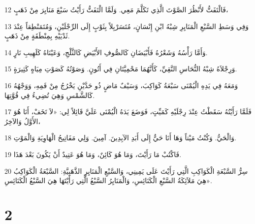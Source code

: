 \par 12 فَالْتَفَتُّ لأَنْظُرَ الصَّوْتَ الَّذِي تَكَلَّمَ مَعِي. وَلَمَّا الْتَفَتُّ رَأَيْتُ سَبْعَ مَنَايِرَ مِنْ ذَهَبٍ،
\par 13 وَفِي وَسَطِ السَّبْعِ الْمَنَايِرِ شِبْهُ ابْنِ إِنْسَانٍ، مُتَسَرْبِلاً بِثَوْبٍ إِلَى الرِّجْلَيْنِ، وَمُتَمَنْطِقاً عِنْدَ ثَدْيَيْهِ بِمِنْطَقَةٍ مِنْ ذَهَبٍ.
\par 14 وَأَمَّا رَأْسُهُ وَشَعْرُهُ فَأَبْيَضَانِ كَالصُّوفِ الأَبْيَضِ كَالثَّلْجِ، وَعَيْنَاهُ كَلَهِيبِ نَارٍ.
\par 15 وَرِجْلاَهُ شِبْهُ النُّحَاسِ النَّقِيِّ، كَأَنَّهُمَا مَحْمِيَّتَانِ فِي أَتُونٍ. وَصَوْتُهُ كَصَوْتِ مِيَاهٍ كَثِيرَةٍ.
\par 16 وَمَعَهُ فِي يَدِهِ الْيُمْنَى سَبْعَةُ كَوَاكِبَ، وَسَيْفٌ مَاضٍ ذُو حَدَّيْنِ يَخْرُجُ مِنْ فَمِهِ، وَوَجْهُهُ كَالشَّمْسِ وَهِيَ تُضِيءُ فِي قُوَّتِهَا.
\par 17 فَلَمَّا رَأَيْتُهُ سَقَطْتُ عِنْدَ رِجْلَيْهِ كَمَيِّتٍ، فَوَضَعَ يَدَهُ الْيُمْنَى عَلَيَّ قَائِلاً لِي: «لاَ تَخَفْ، أَنَا هُوَ الأَوَّلُ وَالآخِرُ،
\par 18 وَالْحَيُّ. وَكُنْتُ مَيْتاً وَهَا أَنَا حَيٌّ إِلَى أَبَدِ الآبِدِينَ. آمِينَ. وَلِي مَفَاتِيحُ الْهَاوِيَةِ وَالْمَوْتِ.
\par 19 فَاكْتُبْ مَا رَأَيْتَ، وَمَا هُوَ كَائِنٌ، وَمَا هُوَ عَتِيدٌ أَنْ يَكُونَ بَعْدَ هَذَا.
\par 20 سِرُّ السَّبْعَةِ الْكَوَاكِبِ الَّتِي رَأَيْتَ عَلَى يَمِينِي، وَالسَّبْعِ الْمَنَايِرِ الذَّهَبِيَّةِ: السَّبْعَةُ الْكَوَاكِبُ هِيَ مَلاَئِكَةُ السَّبْعِ الْكَنَائِسِ، وَالْمَنَايِرُ السَّبْعُ الَّتِي رَأَيْتَهَا هِيَ السَّبْعُ الْكَنَائِسِ».

\chapter{2}

